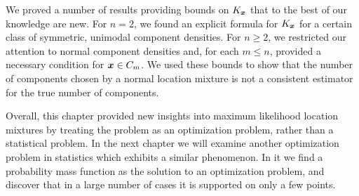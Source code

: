We proved a number of results providing bounds on $K_{\bm{{x}}}$ that to the best of our knowledge are new. For $n = 2$, we found an explicit formula for $K_{\bm{{x}}}$ for a certain class of symmetric, unimodal component densities. For $n \geq 2$, we restricted our attention to normal component densities and, for each $m \leq n$, provided a necessary condition for ${\bm{{x}}} \in C_m$. We used these bounds to show that the number of components chosen by a normal location mixture is not a consistent estimator for the true number of components. 

Overall, this chapter provided new insights into maximum likelihood location mixtures by treating the problem as an optimization problem, rather than a statistical problem.
In the next chapter we will examine another optimization problem in statistics which exhibits a similar phenomenon. In it we find a probability mass function as the solution to an optimization problem, and discover that in a large number of cases it is supported on only a few points.